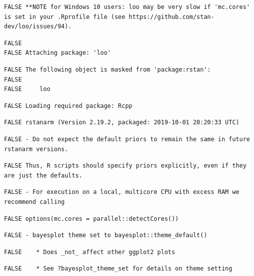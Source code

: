 \documentclass[]{article}
\begin{document}
\begin{verbatim}
FALSE **NOTE for Windows 10 users: loo may be very slow if 'mc.cores' is set in your .Rprofile file (see https://github.com/stan-dev/loo/issues/94).
\end{verbatim}

\begin{verbatim}
FALSE 
FALSE Attaching package: 'loo'
\end{verbatim}

\begin{verbatim}
FALSE The following object is masked from 'package:rstan':
FALSE 
FALSE     loo
\end{verbatim}

\begin{verbatim}
FALSE Loading required package: Rcpp
\end{verbatim}

\begin{verbatim}
FALSE rstanarm (Version 2.19.2, packaged: 2019-10-01 20:20:33 UTC)
\end{verbatim}

\begin{verbatim}
FALSE - Do not expect the default priors to remain the same in future rstanarm versions.
\end{verbatim}

\begin{verbatim}
FALSE Thus, R scripts should specify priors explicitly, even if they are just the defaults.
\end{verbatim}

\begin{verbatim}
FALSE - For execution on a local, multicore CPU with excess RAM we recommend calling
\end{verbatim}

\begin{verbatim}
FALSE options(mc.cores = parallel::detectCores())
\end{verbatim}

\begin{verbatim}
FALSE - bayesplot theme set to bayesplot::theme_default()
\end{verbatim}

\begin{verbatim}
FALSE    * Does _not_ affect other ggplot2 plots
\end{verbatim}

\begin{verbatim}
FALSE    * See ?bayesplot_theme_set for details on theme setting
\end{verbatim}
\end{document}
